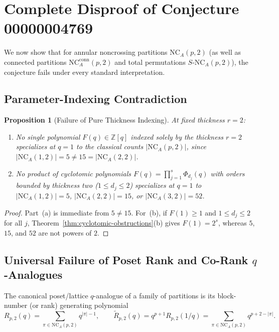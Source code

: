 \documentclass[11pt,a4paper]{article}
\newtheorem{proposition}[theorem]{Proposition}
\theoremstyle{definition}
\theoremstyle{remark}
\newcommand{\NCA}{\mathrm{NC}_A}
\newcommand{\SNCA}{S\text{-}\mathrm{NC}_A}
\begin{document}
\section{Complete Disproof of Conjecture 00000004769}

We now show that for annular noncrossing partitions $\NCA(p,2)$ (as well as connected partitions $\NCA^{\mathrm{conn}}(p,2)$ and total permutations $\SNCA(p,2)$), the conjecture fails under every standard interpretation.

\subsection{Parameter-Indexing Contradiction}

\begin{proposition}[Failure of Pure Thickness Indexing]\label{prop:indexing}
At fixed thickness $r = 2$:
\begin{enumerate}
  \item[(a)] No single polynomial $F(q) \in \mathbb{Z}[q]$ indexed solely by the thickness $r = 2$ specializes at $q = 1$ to the classical counts $|\NCA(p,2)|$, since $|\NCA(1,2)| = 5 \neq 15 = |\NCA(2,2)|$.
  \item[(b)] No product of cyclotomic polynomials $F(q) = \prod_{j=1}^s \Phi_{d_j}(q)$ with orders bounded by thickness two ($1 \le d_j \le 2$) specializes at $q = 1$ to $|\NCA(1,2)| = 5$, $|\NCA(2,2)| = 15$, or $|\NCA(3,2)| = 52$.
\end{enumerate}
\end{proposition}

\begin{proof}
Part~(a) is immediate from $5 \neq 15$. For~(b), if $F(1) \ge 1$ and $1 \le d_j \le 2$ for all $j$, Theorem~\ref{thm:cyclotomic-obstructions}(b) gives $F(1) = 2^s$, whereas $5$, $15$, and $52$ are not powers of $2$.
\end{proof}

\subsection{Universal Failure of Poset Rank and Co-Rank \texorpdfstring{$q$}{q}-Analogues}

The canonical poset/lattice $q$-analogue of a family of partitions is its block-number (or rank) generating polynomial
\[
  R_{p,2}(q) = \sum_{\pi \in \NCA(p,2)} q^{|\pi|-1}, \qquad
  \tilde{R}_{p,2}(q) = q^{p+1} R_{p,2}(1/q) = \sum_{\pi \in \NCA(p,2)} q^{p+2-|\pi|}.
\]
\end{document}
